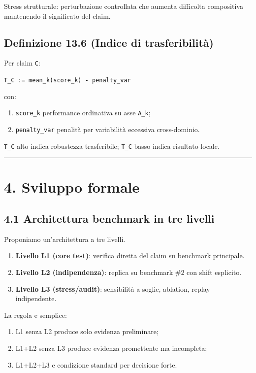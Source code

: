 Stress strutturale: perturbazione controllata che aumenta difficolta compositiva mantenendo il significato del claim.

\subsection{Definizione 13.6 (Indice di trasferibilità)}

Per claim \texttt{C}:

\texttt{T\_C\ :=\ mean\_k(score\_k)\ -\ penalty\_var}

con:

\begin{enumerate}
\def\labelenumi{\arabic{enumi}.}
\tightlist
\item
  \texttt{score\_k} performance ordinativa su asse \texttt{A\_k};
\item
  \texttt{penalty\_var} penalità per variabilità eccessiva cross-dominio.
\end{enumerate}

\texttt{T\_C} alto indica robustezza trasferibile; \texttt{T\_C} basso indica risultato locale.

\begin{center}\rule{0.5\linewidth}{0.5pt}\end{center}

\section{4. Sviluppo formale}

\subsection{4.1 Architettura benchmark in tre livelli}

Proponiamo un'architettura a tre livelli.

\begin{enumerate}
\def\labelenumi{\arabic{enumi}.}
\tightlist
\item
  \textbf{Livello L1 (core test)}: verifica diretta del claim su benchmark principale.
\item
  \textbf{Livello L2 (indipendenza)}: replica su benchmark \#2 con shift esplicito.
\item
  \textbf{Livello L3 (stress/audit)}: sensibilità a soglie, ablation, replay indipendente.
\end{enumerate}

La regola e semplice:

\begin{enumerate}
\def\labelenumi{\arabic{enumi}.}
\tightlist
\item
  L1 senza L2 produce solo evidenza preliminare;
\item
  L1+L2 senza L3 produce evidenza promettente ma incompleta;
\item
  L1+L2+L3 e condizione standard per decisione forte.
\end{enumerate}

